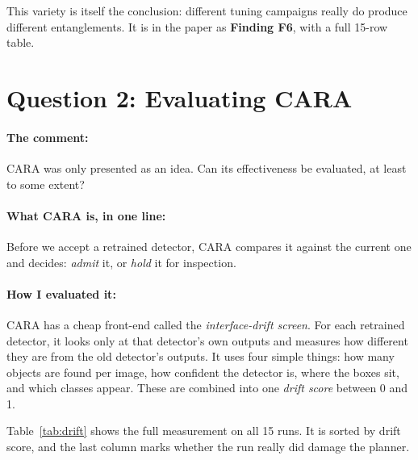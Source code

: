 \documentclass[11pt,a4paper]{article}
\begin{document}
This variety is itself the conclusion: different tuning campaigns really do
produce different entanglements. It is in the paper as \textbf{Finding F6}, with
a full 15-row table.

\section{Question 2: Evaluating CARA}
\label{sec:cara}

\paragraph{The comment:} CARA was only presented as an idea. Can its
effectiveness be evaluated, at least to some extent?

\paragraph{What CARA is, in one line:} Before we accept a retrained detector,
CARA compares it against the current one and decides: \emph{admit} it, or
\emph{hold} it for inspection.

\paragraph{How I evaluated it:} CARA has a cheap front-end called the
\emph{interface-drift screen}. For each retrained detector, it looks only at that
detector's own outputs and measures how different they are from the old
detector's outputs. It uses four simple things: how many objects are found per
image, how confident the detector is, where the boxes sit, and which classes
appear. These are combined into one \emph{drift score} between 0 and 1.

Table~\ref{tab:drift} shows the full measurement on all 15 runs. It is sorted by
drift score, and the last column marks whether the run really did damage the
planner.
\end{document}
